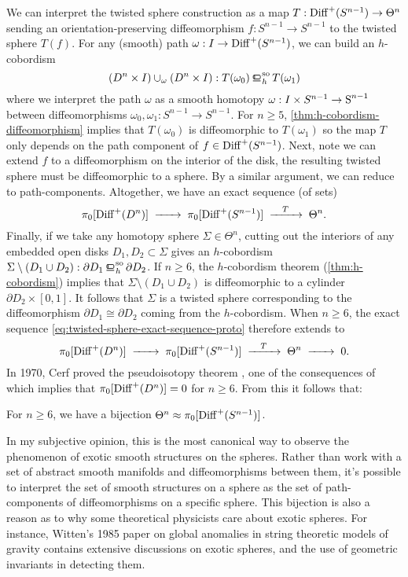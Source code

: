 	We can interpret the twisted sphere construction as a map $T: \op{Diff}^+(S^{n-1})\to \Theta^n$ sending an orientation-preserving diffeomorphism $f : S^{n-1} \to S^{n-1}$ to the twisted sphere $T(f)$. For any (smooth) path $\omega : I \to \op{Diff}^+(S^{n-1})$, we can build an $h$-cobordism 
	\[ (D^n\times I)\cup_\omega (D^n\times I) : T(\omega_0) \sohbord T(\omega_1)\]
	where we interpret the path $\omega$ as a smooth homotopy $\omega : I\times S^{n-1}\to\S^{n-1}$ between diffeomorphisms $\omega_0, \omega_1 : S^{n-1} \to S^{n-1}$. For $n\geq 5$, \cref{thm:h-cobordism-diffeomorphism} implies that $T(\omega_0)$ is diffeomorphic to $T(\omega_1)$ so the map $T$ only depends on the path component of $f\in \op{Diff}^+(S^{n-1})$.
	Next, note we can extend $f$ to a diffeomorphism on the interior of the disk, the resulting twisted sphere must be diffeomorphic to a sphere. By a similar argument, we can reduce to path-components. Altogether, we have an exact sequence (of sets)
	\begin{equation}\label{eq:twisted-sphere-exact-sequence-proto}
		\pi_0 [\op{Diff}^+(D^n)] \lkxto \pi_0 [\op{Diff}^+(S^{n-1})] \lkxto[T] \Theta^n.
	\end{equation}
	Finally, if we take any homotopy sphere $\Sigma\in \Theta^n$, cutting out the interiors of any embedded open disks $D_1, D_2\subset \Sigma$ gives an $h$-cobordism $\Sigma\setminus(D_1\cup D_2) : \partial D_1 \sohbord \partial D_2$. If $n\geq 6$, the $h$-cobordism theorem (\ref{thm:h-cobordism}) implies that $\Sigma \setminus (D_1\cup D_2)$ is diffeomorphic to a cylinder $\partial D_2\times [0,1]$. It follows that $\Sigma$ is a twisted sphere corresponding to the diffeomorphism $\partial D_1 \cong \partial D_2$ coming from the $h$-cobordism.
	When $n\geq 6$, the exact sequence \cref{eq:twisted-sphere-exact-sequence-proto} therefore extends to 
	\[
		\pi_0 [\op{Diff}^+(D^n)] \lkxto \pi_0 [\op{Diff}^+(S^{n-1})] \lkxto[T] \Theta^n \lkxto 0.
	\]
	In 1970, Cerf proved the pseudoisotopy theorem \cite{cerf1970pseudoisotopy}, one of the consequences of which implies that $\pi_0[\op{Diff}^+(D^n)]=0$ for $n\geq 6$. From this it follows that:

	\begin{proposition}
		For $n\geq 6$, we have a bijection $\Theta^n \cong \pi_0[\op{Diff}^+(S^{n-1})]$.
	\end{proposition}

	In my subjective opinion, this is the most canonical way to observe the phenomenon of exotic smooth structures on the spheres. Rather than work with a set of abstract smooth manifolds and diffeomorphisms between them, it's possible to interpret the set of smooth structures on a sphere as the set of path-components of diffeomorphisms on a specific sphere. This bijection is also a reason as to why some theoretical physicists care about exotic spheres.  
	For instance, Witten's 1985 paper \cite{witten1985global} on global anomalies in string theoretic models of gravity contains extensive discussions on exotic spheres, and the use of geometric invariants in detecting them.


